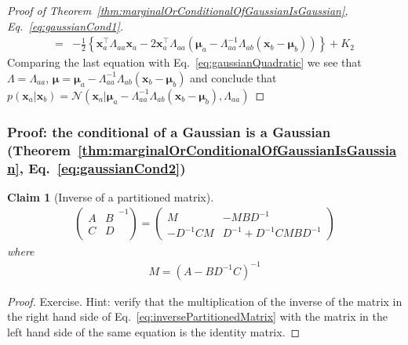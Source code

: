 \documentclass{beamer}
\newtheorem{claim}{Claim}
\begin{document}
\begin{frame}
\begin{proof}[Proof of Theorem~\ref{thm:marginalOrConditionalOfGaussianIsGaussian}, Eq.~\ref{eq:gaussianCond1}]
\begin{align*}
			                  =&-\frac{1}{2}\left\{\mathbf{x}_a^\intercal\Lambda_{aa}\mathbf{x}_a-2\mathbf{x}_a^\intercal\Lambda_{aa}(\boldsymbol{\mu}_a-\Lambda_{aa}^{-1}\Lambda_{ab}(\mathbf{x}_b-\boldsymbol{\mu}_b))\right\}+K_2
		\end{align*}
		Comparing the last equation with Eq.~\ref{eq:gaussianQuadratic} we see that $\Lambda=\Lambda_{aa}$, $\boldsymbol{\mu}=\boldsymbol{\mu}_a-\Lambda_{aa}^{-1}\Lambda_{ab}(\mathbf{x}_b-\boldsymbol{\mu}_b)$ and conclude that $p(\mathbf{x}_a|\mathbf{x}_b)=\mathcal{N}(\mathbf{x}_a|\boldsymbol{\mu}_a-\Lambda_{aa}^{-1}\Lambda_{ab}(\mathbf{x}_b-\boldsymbol{\mu}_b),\Lambda_{aa})$
		\normalsize
	\end{proof}
\end{frame}

\begin{frame}
    \frametitle{Proof: the conditional of a Gaussian is a Gaussian (Theorem~\ref{thm:marginalOrConditionalOfGaussianIsGaussian}, Eq.~\ref{eq:gaussianCond2})}

	\begin{claim}[Inverse of a partitioned matrix]
		\begin{align}
			\left(\begin{array}{cc}
				      A & B\\
				      C & D
				  \end{array}^{-1}\right)=
			\left(\begin{array}{cc}
				      M         & -MBD^{-1}\\
					  -D^{-1}CM & D^{-1} + D^{-1}CMBD^{-1}
				  \end{array}\right)\label{eq:inversePartitionedMatrix}
		\end{align}
		where
		\begin{align*}
			M = (A - BD^{-1}C)^{-1}
		\end{align*}
	\end{claim}
	\begin{proof}
		\scriptsize
		Exercise. Hint: verify that the multiplication of the inverse of the matrix in the right hand side of Eq.~\ref{eq:inversePartitionedMatrix} with the matrix in the left hand side of the same equation is the identity matrix.
		\phantom\qedhere
		\normalsize
	\end{proof}
\end{frame}
\end{document}
